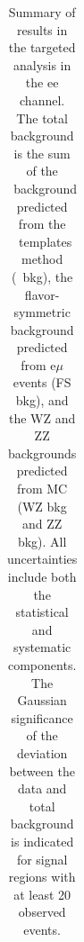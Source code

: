\begin{table}[htb]
\begin{center}
\footnotesize
\caption{\label{tab:results_targ_ee}\footnotesize Summary of results in the targeted analysis in the ee channel. The total background is the sum of the \zjets\ background predicted from
the \MET\ templates method (\zjets\ bkg), the flavor-symmetric background predicted from e$\mu$ events (FS bkg), and the WZ and ZZ backgrounds predicted from MC
(WZ bkg and ZZ bkg). All uncertainties include both the statistical and systematic components. The Gaussian significance of the deviation between the data 
and total background is indicated for signal regions with at least 20 observed events. }
\begin{tabular}{l|c|c|c|c}




\end{tabular}
\end{center}
\end{table}
